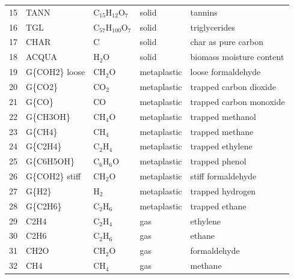\begin{center}
\begin{longtable}{cllll}
        15 & TANN           & C$_{15}$H$_{12}$O$_7$   & \cellcolor{green!25}solid        & tannins \\
        16 & TGL            & C$_{57}$H$_{100}$O$_7$  & \cellcolor{green!25}solid        & triglycerides \\
        17 & CHAR           & C                       & \cellcolor{green!25}solid        & char as pure carbon \\
        18 & ACQUA          & H$_2$O                  & \cellcolor{green!25}solid        & biomass moisture content \\
        19 & G\{COH2\} loose& CH$_2$O                 & \cellcolor{orange!25}metaplastic & loose formaldehyde \\
        20 & G\{CO2\}       & CO$_2$                  & \cellcolor{orange!25}metaplastic & trapped carbon dioxide \\
        21 & G\{CO\}        & CO                      & \cellcolor{orange!25}metaplastic & trapped carbon monoxide \\
        22 & G\{CH3OH\}     & CH$_4$O                 & \cellcolor{orange!25}metaplastic & trapped methanol \\
        23 & G\{CH4\}       & CH$_4$                  & \cellcolor{orange!25}metaplastic & trapped methane \\
        24 & G\{C2H4\}      & C$_2$H$_4$              & \cellcolor{orange!25}metaplastic & trapped ethylene \\
        25 & G\{C6H5OH\}    & C$_6$H$_6$O             & \cellcolor{orange!25}metaplastic & trapped phenol \\
        26 & G\{COH2\} stiff& CH$_2$O                 & \cellcolor{orange!25}metaplastic & stiff formaldehyde \\
        27 & G\{H2\}        & H$_2$                   & \cellcolor{orange!25}metaplastic & trapped hydrogen \\
        28 & G\{C2H6\}      & C$_2$H$_6$              & \cellcolor{orange!25}metaplastic & trapped ethane \\
        29 & C2H4           & C$_2$H$_4$              & \cellcolor{purple!25}gas         & ethylene \\
        30 & C2H6           & C$_2$H$_6$              & \cellcolor{purple!25}gas         & ethane \\
        31 & CH2O           & CH$_2$O                 & \cellcolor{purple!25}gas         & formaldehyde \\
        32 & CH4            & CH$_4$                  & \cellcolor{purple!25}gas         & methane \\

\end{longtable}
\end{center}
